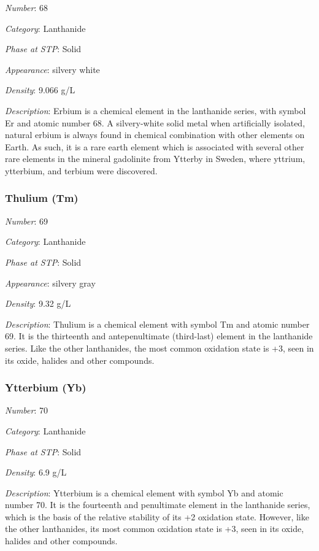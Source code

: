 \documentclass{article}
\begin{document}
\textit{Number}: 68

\textit{Category}: Lanthanide

\textit{Phase at STP}: Solid

\textit{Appearance}: silvery white

\textit{Density}: 9.066 g/L

\textit{Description}: Erbium is a chemical element in the lanthanide series, with symbol Er and atomic number 68. A silvery-white solid metal when artificially isolated, natural erbium is always found in chemical combination with other elements on Earth. As such, it is a rare earth element which is associated with several other rare elements in the mineral gadolinite from Ytterby in Sweden, where yttrium, ytterbium, and terbium were discovered.

\hypertarget{subsubsection::Tm}{}\subsubsection{Thulium (Tm)}

\textit{Number}: 69

\textit{Category}: Lanthanide

\textit{Phase at STP}: Solid

\textit{Appearance}: silvery gray

\textit{Density}: 9.32 g/L

\textit{Description}: Thulium is a chemical element with symbol Tm and atomic number 69. It is the thirteenth and antepenultimate (third-last) element in the lanthanide series. Like the other lanthanides, the most common oxidation state is +3, seen in its oxide, halides and other compounds.

\hypertarget{subsubsection::Yb}{}\subsubsection{Ytterbium (Yb)}

\textit{Number}: 70

\textit{Category}: Lanthanide

\textit{Phase at STP}: Solid

\textit{Density}: 6.9 g/L

\textit{Description}: Ytterbium is a chemical element with symbol Yb and atomic number 70. It is the fourteenth and penultimate element in the lanthanide series, which is the basis of the relative stability of its +2 oxidation state. However, like the other lanthanides, its most common oxidation state is +3, seen in its oxide, halides and other compounds.
\end{document}
